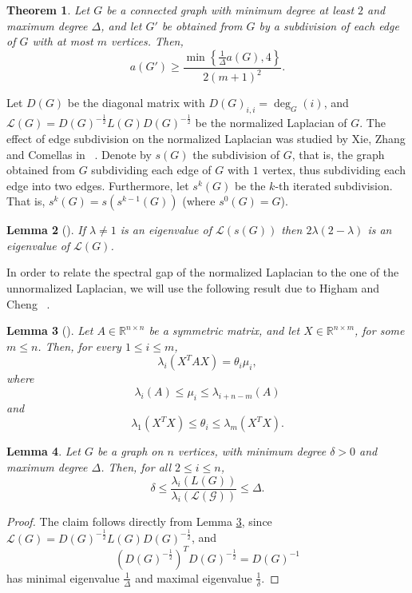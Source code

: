 \documentclass[a4paper,11pt]{article}
\theoremstyle{plain}
\newtheorem{theorem}{\bf Theorem}[section]
\newtheorem{lemma}[theorem]{\bf Lemma}
\theoremstyle{definition}
\newcommand{\Rea}{{\mathbb R}}
\begin{document}
\begin{theorem}\label{thm:subdivided_spectral_gap}
Let $G$ be a connected graph with minimum degree at least $2$ and maximum degree $\Delta$, and let $G'$ be obtained from $G$ by a subdivision of each edge of $G$ with at most $m$ vertices. Then,
\[
a(G')\geq \frac{\min\left\{\frac{1}{\Delta}a(G),4\right\}}{2 (m+1)^2}.
\]
\end{theorem}


 Let $D(G)$ be the diagonal matrix with $D(G)_{i,i}=\deg_G(i)$, and $\mathcal{L}(G)=D(G)^{-\frac{1}{2}} L(G) D(G)^{-\frac{1}{2}}$ be the normalized Laplacian of $G$.  
 The effect of edge subdivision on the normalized Laplacian was studied by Xie, Zhang and Comellas in ~\cite{xie2016normalized}. Denote by $s(G)$ the subdivision of $G$, that is, the graph obtained from $G$ subdividing each edge of $G$ with $1$ vertex, thus subdividing each edge into two edges. Furthermore, let $s^k(G)$ be the $k$-th iterated subdivision. That is, $s^k(G)=s(s^{k-1}(G))$ (where  $s^{0}(G)=G$).


\begin{lemma}[{\cite[Lemma 3.1]{xie2016normalized}}]\label{lemma:normalized_subdivision}
If $\lambda\neq 1$ is an eigenvalue of $\mathcal{L}(s(G))$ then $2\lambda(2-\lambda)$ is an eigenvalue of $\mathcal{L}(G)$.
\end{lemma}

In order to relate the spectral gap of the normalized Laplacian to the one of the unnormalized Laplacian, we will use the following result due to Higham and Cheng ~\cite{higham1998modifying}.



\begin{lemma}[{\cite[Theorem 3.2]{higham1998modifying}}]\label{lemma:inertia}
Let $A\in \Rea^{n\times n}$ be a symmetric matrix, and let $X\in \Rea^{n\times m}$, for some $m\leq n$. Then, for every $1\leq i\leq m$,
\[
    \lambda_{i}(X^{T} A X) = \theta_i \mu_i,
\]
where
\[
\lambda_i(A)\leq \mu_i\leq \lambda_{i+n-m}(A)
\]
and
\[
\lambda_1(X^T X) \leq \theta_i\leq \lambda_m(X^T X).
\]
\end{lemma}

\begin{lemma}\label{lemma:normalized_vs_unnormalized}
Let $G$ be a graph on $n$ vertices, with minimum degree $\delta>0$ and maximum degree $\Delta$. Then, for all $2\leq i\leq n$,
\[
  \delta\leq  \frac{\lambda_i(L(G))}{\lambda_i(\mathcal{L(G)})}\leq \Delta.
\]
\end{lemma}
\begin{proof}
The claim follows directly from Lemma \ref{lemma:inertia}, since $\mathcal{L}(G)=D(G)^{-\frac{1}{2}} L(G) D(G)^{-\frac{1}{2}}$, and \[(D(G)^{-\frac{1}{2}})^T D(G)^{-\frac{1}{2}}=D(G)^{-1}\] has minimal eigenvalue $\frac{1}{\Delta}$ and maximal eigenvalue $\frac{1}{\delta}$. 
\end{proof}
\end{document}
